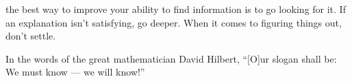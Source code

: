  the best way to improve your ability to find
information is to go looking for it. If an explanation isn't satisfying, go
deeper. When it comes to figuring things out, don't settle.

In the words of the great mathematician David Hilbert, ``[O]ur slogan shall be:
We must know — we will know!''

